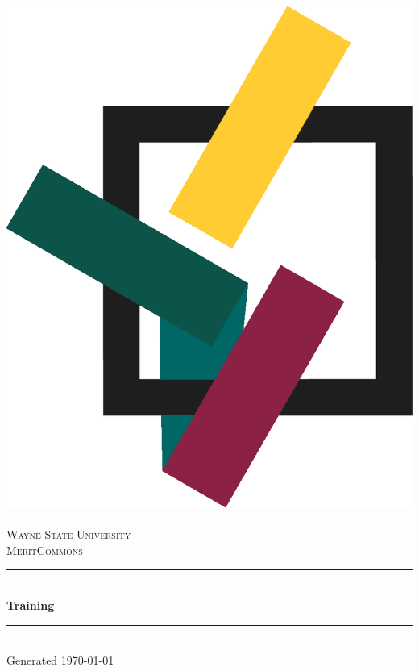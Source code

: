 \begin{titlepage}
\begin{center}
\newcommand{\HRule}{\rule{\linewidth}{0.5mm}}

\includegraphics[scale=1]{./meritcommons_logo}~\\[1cm]

\textcolor{wsugreen}{\textsc{\LARGE Wayne State University}}\\[0.1cm]
\textcolor{wsugreen}{\textsc{\LARGE MeritCommons}}\\[0.5cm]

\HRule \\[0.4cm]
{\huge \bfseries Training}\\[0.2cm]
\HRule \\[1.5cm]



\vfill
{\scriptsize Generated \today}

\end{center}
\end{titlepage}
